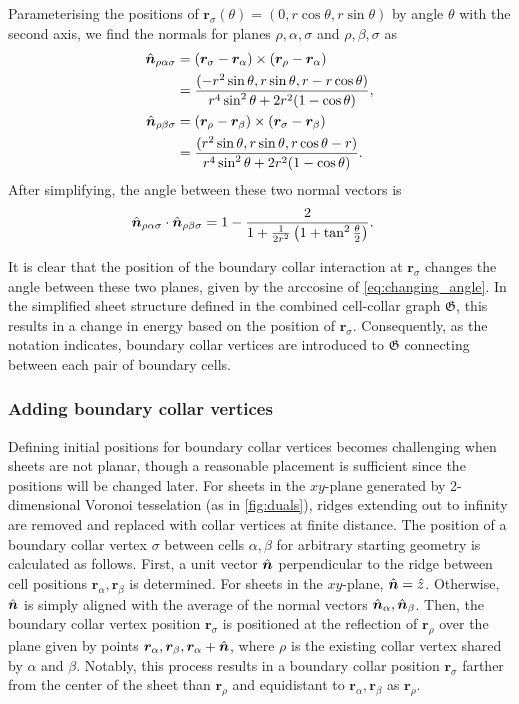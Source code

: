 Parameterising the positions of $\bm{r}_\sigma(\theta) = (0, r\cos\theta, r\sin\theta)$ by angle $\theta$ with the second axis, we find the normals for planes $\rho, \alpha, \sigma$ and $\rho, \beta, \sigma$ as 
\begin{align*}
	\hat{\bm{n}}_{\rho\alpha\sigma} &= (\bm{r}_\sigma - \bm{r}_\alpha) \times (\bm{r}_\rho - \bm{r}_\alpha) \\
	&= \frac{(-r^2 \sin\theta, r\sin\theta, r - r\cos\theta)}{r^4\sin^2\theta + 2r^2(1-\cos\theta)}, \\
	\hat{\bm{n}}_{\rho\beta\sigma} &= (\bm{r}_{\rho} - \bm{r}_\beta) \times (\bm{r}_\sigma - \bm{r}_\beta)\\
	&= \frac{(r^2 \sin\theta, r\sin\theta, r\cos\theta - r)}{r^4\sin^2\theta + 2r^2(1-\cos\theta)}.
\end{align*}
\noindent After simplifying, the angle between these two normal vectors is 
\begin{align}
	\hat{\bm{n}}_{\rho\alpha\sigma} \cdot \hat{\bm{n}}_{\rho\beta\sigma} &= 1 - \frac{2}{1 + \frac{1}{2r^2} \left( 1 + \tan^2 \frac{\theta}{2}\right)}. \label{eq:changing_angle}
\end{align}

It is clear that the position of the boundary collar interaction at $\bm{r}_\sigma$ changes the angle between these two planes, given by the arccosine of \cref{eq:changing_angle}. 
In the simplified sheet structure defined in the combined cell-collar graph $\mathfrak{G}$, this results in a change in energy based on the position of $\bm{r}_\sigma$. 
Consequently, as the notation indicates, boundary collar vertices are introduced to $\mathfrak{G}$ connecting between each pair of boundary cells.

\subsubsection{Adding boundary collar vertices}

Defining initial positions for boundary collar vertices becomes challenging when sheets are not planar, though a reasonable placement is sufficient since the positions will be changed later. 
For sheets in the $xy$-plane generated by 2-dimensional Voronoi tesselation (as in \cref{fig:duals}), ridges extending out to infinity are removed and replaced with collar vertices at finite distance. 
The position of a boundary collar vertex $\sigma$ between cells $\alpha, \beta$ for arbitrary starting geometry is calculated as follows. 
First, a unit vector $\hat{\bm{n}}$ perpendicular to the ridge between cell positions $\bm{r}_\alpha, \bm{r}_\beta$ is determined. 
For sheets in the $xy$-plane, $\hat{\bm{n}}=\hat{z}$. 
Otherwise, $\hat{\bm{n}}$ is simply aligned with the average of the normal vectors $\hat{\bm{n}}_\alpha, \hat{\bm{n}}_\beta$.
Then, the boundary collar vertex position $\bm{r}_\sigma$ is positioned at the reflection of $\bm{r}_\rho$ over the plane given by points $\bm{r}_\alpha, \bm{r}_\beta, \bm{r}_\alpha + \hat{\bm{n}}$, where $\rho$ is the existing collar vertex shared by $\alpha$ and $\beta$.
Notably, this process results in a boundary collar position $\bm{r}_\sigma$ farther from the center of the sheet than $\bm{r}_\rho$ and equidistant to $\bm{r}_\alpha, \bm{r}_\beta$ as $\bm{r}_\rho$. 

